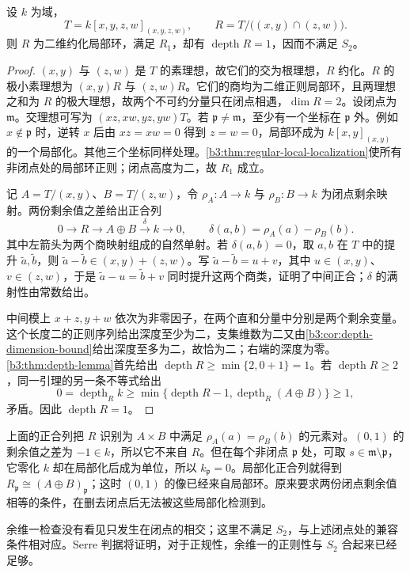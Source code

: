 \begin{example}\label{b3:exm:r1-not-s2}
	设 \(k\) 为域，
	\[
		T=k[x,y,z,w]_{(x,y,z,w)},\qquad R=T/\bigl((x,y)\cap(z,w)\bigr).
	\]
	则 \(R\) 为二维约化局部环，满足 \(R_1\)，却有 \(\operatorname{depth}R=1\)，因而不满足 \(S_2\)。
\end{example}
\begin{proof}
	\((x,y)\) 与 \((z,w)\) 是 \(T\) 的素理想，故它们的交为根理想，\(R\) 约化。\(R\) 的极小素理想为 \((x,y)R\) 与 \((z,w)R\)。它们的商均为二维正则局部环，且两理想之和为 \(R\) 的极大理想，故两个不可约分量只在闭点相遇，\(\dim R=2\)。设闭点为 \(\mathfrak m\)。交理想可写为 \((xz,xw,yz,yw)T\)。若 \(\mathfrak p\ne\mathfrak m\)，至少有一个坐标在 \(\mathfrak p\) 外。例如 \(x\notin\mathfrak p\) 时，逆转 \(x\) 后由 \(xz=xw=0\) 得到 \(z=w=0\)，局部环成为 \(k[x,y]_{(x,y)}\) 的一个局部化。其他三个坐标同样处理。\cref{b3:thm:regular-local-localization}使所有非闭点处的局部环正则；闭点高度为二，故 \(R_1\) 成立。

	记 \(A=T/(x,y)\)、\(B=T/(z,w)\)，令 \(\rho_A:A\to k\) 与 \(\rho_B:B\to k\) 为闭点剩余映射。两份剩余值之差给出正合列
	\[
		0\longrightarrow R\longrightarrow A\oplus B \xrightarrow{\delta}k\longrightarrow0, \qquad \delta(a,b)=\rho_A(a)-\rho_B(b).
	\]
	其中左箭头为两个商映射组成的自然单射。若 \(\delta(a,b)=0\)，取 \(a,b\) 在 \(T\) 中的提升 \(\tilde a,\tilde b\)，则 \(\tilde a-\tilde b\in(x,y)+(z,w)\)。写 \(\tilde a-\tilde b=u+v\)，其中 \(u\in(x,y)\)、\(v\in(z,w)\)，于是 \(\tilde a-u=\tilde b+v\) 同时提升这两个商类，证明了中间正合；\(\delta\) 的满射性由常数给出。

	中间模上 \(x+z,y+w\) 依次为非零因子，在两个直和分量中分别是两个剩余变量。这个长度二的正则序列给出深度至少为二，支集维数为二又由\cref{b3:cor:depth-dimension-bound}给出深度至多为二，故恰为二；右端的深度为零。\cref{b3:thm:depth-lemma}首先给出 \(\operatorname{depth}R\ge\min\{2,0+1\}=1\)。若 \(\operatorname{depth}R\ge2\)，同一引理的另一条不等式给出
	\[
		0=\operatorname{depth}_Rk \ge\min\{\operatorname{depth}R-1,\operatorname{depth}_R(A\oplus B)\} \ge1,
	\]
	矛盾。因此 \(\operatorname{depth}R=1\)。
\end{proof}

上面的正合列把 \(R\) 识别为 \(A\times B\) 中满足 \(\rho_A(a)=\rho_B(b)\) 的元素对。\((0,1)\) 的剩余值之差为 \(-1\in k\)，所以它不来自 \(R\)。但在每个非闭点 \(\mathfrak p\) 处，可取 \(s\in\mathfrak m\setminus\mathfrak p\)，它零化 \(k\) 却在局部化后成为单位，所以 \(k_{\mathfrak p}=0\)。局部化正合列就得到 \(R_{\mathfrak p}\cong(A\oplus B)_{\mathfrak p}\)；这时 \((0,1)\) 的像已经来自局部环。原来要求两份闭点剩余值相等的条件，在删去闭点后无法被这些局部化检测到。

\ProseParagraphBreak
余维一检查没有看见只发生在闭点的相交；这里不满足 \(S_2\)，与上述闭点处的兼容条件相对应。Serre 判据将证明，对于正规性，余维一的正则性与 \(S_2\) 合起来已经足够。
